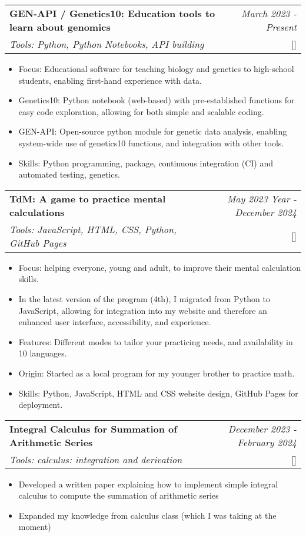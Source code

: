 \documentclass[a4paper,11pt]{article}
\makeatletter
\newcommand{\resumeProject}[4]{
\vspace{0.5mm}\item
    \begin{tabular*}{0.98\textwidth}[t]{l@{\extracolsep{\fill}}r}
        \textbf{#1} & \textit{\footnotesize{#3}} \\
        \footnotesize{\textit{#2}} & \footnotesize{#4}
    \end{tabular*}
    \vspace{-2.4mm}
}
\newcommand{\resumeItemListStart}{\begin{itemize}[leftmargin=*,labelsep=1mm,itemsep=0.5mm]}
\newcommand{\resumeItemListEnd}{\end{itemize}\vspace{-2mm}}
\makeatother
\begin{document}
{\resumeProject
  {GEN-API / Genetics10: Education tools to learn about genomics}
  {Tools: Python, Python Notebooks, API building}
  {March 2023 - Present}
  {{}[\href{https://joanalnu.github.io/genetics10.html}{\textcolor{darkblue}{\faIcon{globe}}}]}
\resumeItemListStart
  \item Focus: Educational software for teaching biology and genetics to high-school students, enabling first-hand experience with data.
  \item Genetics10: Python notebook (web-based) with pre-established functions for easy code exploration, allowing for both simple and scalable coding.
  \item GEN-API: Open-source python module for genetic data analysis, enabling system-wide use of genetics10 functions, and integration with other tools.  
  \item Skills: Python programming, package, continuous integration (CI) and automated testing, genetics.
\resumeItemListEnd

\resumeProject
  {TdM: A game to practice mental calculations}
  {Tools: JavaScript, HTML, CSS, Python, GitHub Pages}
  {May 2023 Year - December 2024}
  {{}[\href{https://joanalnu.github.io/tdm/index.html}{\textcolor{darkblue}{\faIcon{globe}}}]}
\resumeItemListStart
  \item Focus: helping everyone, young and adult, to improve their mental calculation skills.
  \item In the latest version of the program (4th), I migrated from Python to JavaScript, allowing for integration into my website and therefore an enhanced user interface, accessibility, and experience.
  \item Features: Different modes to tailor your practicing needs, and availability in 10 languages.
  \item Origin: Started as a local program for my younger brother to practice math.
  \item Skills: Python, JavaScript, HTML and CSS website design, GitHub Pages for deployment.
\resumeItemListEnd

\resumeProject
  {Integral Calculus for Summation of Arithmetic Series}
  {Tools: calculus: integration and derivation}
  {December 2023 - February 2024}
  {{}[\href{https://1drv.ms/w/c/3f20be7bd62b5968/IQRoWSvWe74gIIA_hw4AAAAAARmWxJtEzmu_-EA_D4_Qq-0}{\textcolor{darkblue}{\faIcon{globe}}}]}
\resumeItemListStart
  \item Developed a written paper explaining how to implement simple integral calculus to compute the summation of arithmetic series
  \item Expanded my knowledge from calculus class (which I was taking at the moment)
\resumeItemListEnd

}
\end{document}
